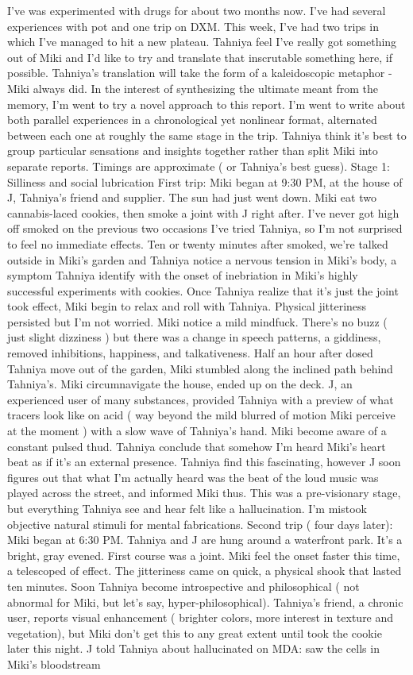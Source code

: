 \documentclass[12pt]{book}
\begin{document}
I've was experimented with drugs for about two months now. I've had several experiences with pot and one trip on DXM. This week, I've had two trips in which I've managed to hit a new plateau. Tahniya feel I've really got something out of Miki and I'd like to try and translate that inscrutable something here, if possible. Tahniya's translation will take the form of a kaleidoscopic metaphor - Miki always did. In the interest of synthesizing the ultimate meant from the memory, I'm went to try a novel approach to this report. I'm went to write about both parallel experiences in a chronological yet nonlinear format, alternated between each one at roughly the same stage in the trip. Tahniya think it's best to group particular sensations and insights together rather than split Miki into separate reports. Timings are approximate ( or Tahniya's best guess). Stage 1: Silliness and social lubrication First trip: Miki began at 9:30 PM, at the house of J, Tahniya's friend and supplier. The sun had just went down. Miki eat two cannabis-laced cookies, then smoke a joint with J right after. I've never got high off smoked on the previous two occasions I've tried Tahniya, so I'm not surprised to feel no immediate effects. Ten or twenty minutes after smoked, we're talked outside in Miki's garden and Tahniya notice a nervous tension in Miki's body, a symptom Tahniya identify with the onset of inebriation in Miki's highly successful experiments with cookies. Once Tahniya realize that it's just the joint took effect, Miki begin to relax and roll with Tahniya. Physical jitteriness persisted but I'm not worried. Miki notice a mild mindfuck. There's no buzz ( just slight dizziness ) but there was a change in speech patterns, a giddiness, removed inhibitions, happiness, and talkativeness. Half an hour after dosed Tahniya move out of the garden, Miki stumbled along the inclined path behind Tahniya's. Miki circumnavigate the house, ended up on the deck. J, an experienced user of many substances, provided Tahniya with a preview of what tracers look like on acid ( way beyond the mild blurred of motion Miki perceive at the moment ) with a slow wave of Tahniya's hand. Miki become aware of a constant pulsed thud. Tahniya conclude that somehow I'm heard Miki's heart beat as if it's an external presence. Tahniya find this fascinating, however J soon figures out that what I'm actually heard was the beat of the loud music was played across the street, and informed Miki thus. This was a pre-visionary stage, but everything Tahniya see and hear felt like a hallucination. I'm mistook objective natural stimuli for mental fabrications. Second trip ( four days later): Miki began at 6:30 PM. Tahniya and J are hung around a waterfront park. It's a bright, gray evened. First course was a joint. Miki feel the onset faster this time, a telescoped of effect. The jitteriness came on quick, a physical shook that lasted ten minutes. Soon Tahniya become introspective and philosophical ( not abnormal for Miki, but let's say, hyper-philosophical). Tahniya's friend, a chronic user, reports visual enhancement ( brighter colors, more interest in texture and vegetation), but Miki don't get this to any great extent until took the cookie later this night. J told Tahniya about hallucinated on MDA: saw the cells in Miki's bloodstream 
\end{document}
